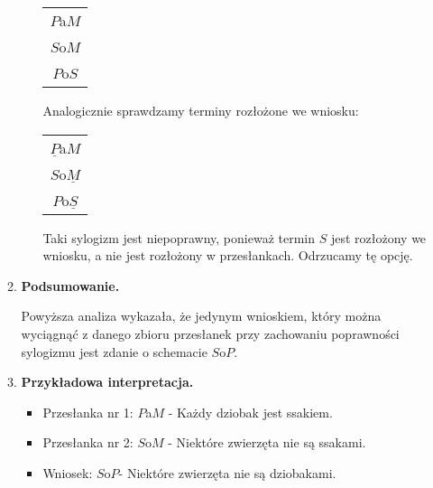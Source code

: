 \documentclass[12pt]{article}
\begin{document}
\begin{itemize}
\begin{enumerate}
\begin{enumerate}
\begin{center}
	\begin{tabular}{c}
		$P$a$M$ \\ 
		$S$o$M$ \\ 
		\hline 
		$P$o$S$ 
	\end{tabular} 
\end{center}
Analogicznie sprawdzamy terminy rozłożone we wniosku:
\begin{center}
	\begin{tabular}{c}
		$\underline{P}$a$M$ \\ 
		$S$o$\underline{M}$ \\ 
		\hline 
		$P$o$\underline{S}$ 
	\end{tabular} 

Taki sylogizm jest niepoprawny, ponieważ termin $S$ jest rozłożony we wniosku, a nie jest rozłożony w przesłankach. Odrzucamy tę opcję.
\end{center}
			\end{enumerate}
		\item \textbf{Podsumowanie.}
		
		Powyższa analiza wykazała, że jedynym wnioskiem, który można wyciągnąć z danego zbioru przesłanek przy zachowaniu poprawności sylogizmu jest zdanie o schemacie $S$o$P$.
		\item \textbf{Przykładowa interpretacja. }
		
		\begin{itemize}
			\item Przesłanka nr 1: $P$a$M$ - Każdy dziobak jest ssakiem.
			\item Przesłanka nr 2: $S$o$M$ - Niektóre zwierzęta nie są ssakami.
			\item Wniosek: $S$o$P$- Niektóre zwierzęta nie są dziobakami.
		\end{itemize}
		\end{enumerate}
	\end{itemize}
\end{document}
